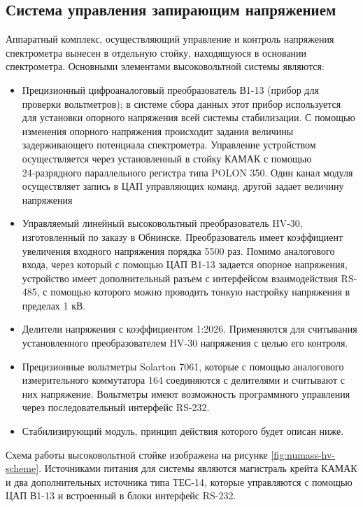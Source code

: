 \documentclass[a4paper,14pt]{extreport}
\begin{document}
\subsection{Система управления запирающим напряжением}

Аппаратный комплекс, осуществляющий управление и контроль напряжения спектрометра вынесен в отдельную стойку, находящуюся в основании спектрометра. Основными элементами высоковольтной системы являются:
\begin{itemize}
    \item Прецизионный цифроаналоговый преобразователь В1-13 (прибор для проверки вольтметров); в системе сбора данных этот прибор используется для установки опорного напряжения всей системы стабилизации. С помощью изменения опорного напряжения происходит задания величины задерживающего потенциала спектрометра. Управление устройством осуществляется через установленный в стойку КАМАК с помощью 24‑разрядного параллельного регистра типа POLON 350. Один канал модуля осуществляет запись в ЦАП управляющих команд, другой задает величину напряжения
    \item Управляемый линейный высоковольтный преобразователь HV-30, изготовленный по заказу в Обнинске. Преобразователь имеет коэффициент увеличения входного напряжения порядка 5500 раз. Помимо аналогового входа, через который с помощью ЦАП В1-13 задается опорное напряжения, устройство имеет дополнительный разъем с интерфейсом взаимодействия RS-485, с помощью которого можно проводить тонкую настройку напряжения в пределах 1 кВ.
    \item Делители напряжения с коэффициентом 1:2026. Применяются для считывания установленного преобразователем HV-30 напряжения с целью его контроля.
    \item Прецизионные вольтметры Solarton 7061, которые с помощью аналогового измерительного коммутатора 164 соединяются с делителями и считывают с них напряжение. Вольтметры имеют возможность программного управления через последовательный интерфейс RS-232.
    \item Стабилизирующий модуль, принцип действия которого будет описан ниже.
\end{itemize}

Схема работы высоковольтной стойке изображена на рисунке \ref{fig:numass-hv-scheme}. Источниками питания для системы являются магистраль крейта КАМАК и два дополнительных источника типа ТЕС-14, которые управляются с помощью ЦАП В1-13 и встроенный в блоки интерфейс RS-232.
\end{document}
